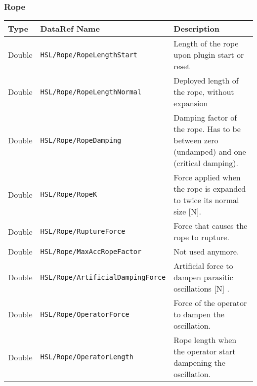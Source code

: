 \documentclass[10pt,a4]{scrartcl}
\begin{document}
\subsubsection{Rope}
\begin{tabularx}{\linewidth}{| l | l | X |} \hline
\textbf{Type} & \textbf{DataRef Name}& \textbf{Description}\\ \hline
Double & \texttt{HSL/Rope/RopeLengthStart} & Length of the rope upon plugin start or reset\\ \hline
Double & \texttt{HSL/Rope/RopeLengthNormal} & Deployed length of the rope, without expansion\\ \hline
Double & \texttt{HSL/Rope/RopeDamping} & Damping factor of the rope. Has to be between zero (undamped) and one (critical damping).\\ \hline
Double & \texttt{HSL/Rope/RopeK} & Force applied when the rope is expanded to twice its normal size [N].\\ \hline
Double & \texttt{HSL/Rope/RuptureForce} & Force that causes the rope to rupture.\\ \hline
Double & \texttt{HSL/Rope/MaxAccRopeFactor} & Not used anymore.\\ \hline
Double & \texttt{HSL/Rope/ArtificialDampingForce} & Artificial force to dampen parasitic oscillations [N] .\\ \hline
Double & \texttt{HSL/Rope/OperatorForce} & Force of the operator to dampen the oscillation.\\ \hline
Double & \texttt{HSL/Rope/OperatorLength} & Rope length when the operator start dampening the oscillation.\\ \hline
\end{tabularx}
\end{document}
